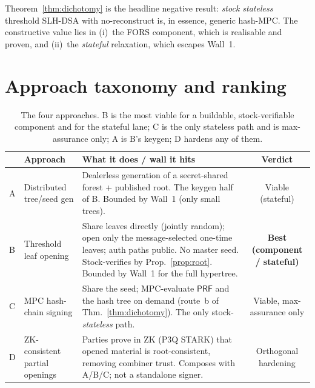 \documentclass[11pt,a4paper]{article}
\newcommand{\PRF}{\mathsf{PRF}}
\begin{document}
Theorem~\ref{thm:dichotomy} is the headline negative result: \emph{stock stateless}
threshold SLH-DSA with no-reconstruct is, in essence, generic hash-MPC. The
constructive value lies in (i)~the FORS component, which is realisable and proven,
and (ii)~the \emph{stateful} relaxation, which escapes Wall~1.

\section{Approach taxonomy and ranking}
\label{sec:approaches}

\begin{table}[H]
\centering
\small
\begin{tabularx}{\textwidth}{@{}l l X c@{}}
\toprule
& \textbf{Approach} & \textbf{What it does / wall it hits} & \textbf{Verdict} \\
\midrule
A & Distributed tree/seed gen & Dealerless generation of a secret-shared forest +
published root. The keygen half of B. Bounded by Wall~1 (only small trees). &
Viable (stateful) \\[2pt]
B & Threshold leaf opening & Share leaves directly (jointly random); open only the
message-selected one-time leaves; auth paths public. No master seed. Stock-verifies
by Prop.~\ref{prop:root}. Bounded by Wall~1 for the full hypertree. &
\textbf{Best (component / stateful)} \\[2pt]
C & MPC hash-chain signing & Share the seed; MPC-evaluate $\PRF$ and the hash tree
on demand (route~b of Thm.~\ref{thm:dichotomy}). The only stock-\emph{stateless}
path. & Viable, max-assurance only \\[2pt]
D & ZK-consistent partial openings & Parties prove in ZK (P3Q STARK) that opened
material is root-consistent, removing combiner trust. Composes with A/B/C; not a
standalone signer. & Orthogonal hardening \\
\bottomrule
\end{tabularx}
\caption{The four approaches. B is the most viable for a buildable,
stock-verifiable component and for the stateful lane; C is the only stateless path
and is max-assurance only; A is B's keygen; D hardens any of them.}
\label{tab:approaches}
\end{table}
\end{document}
